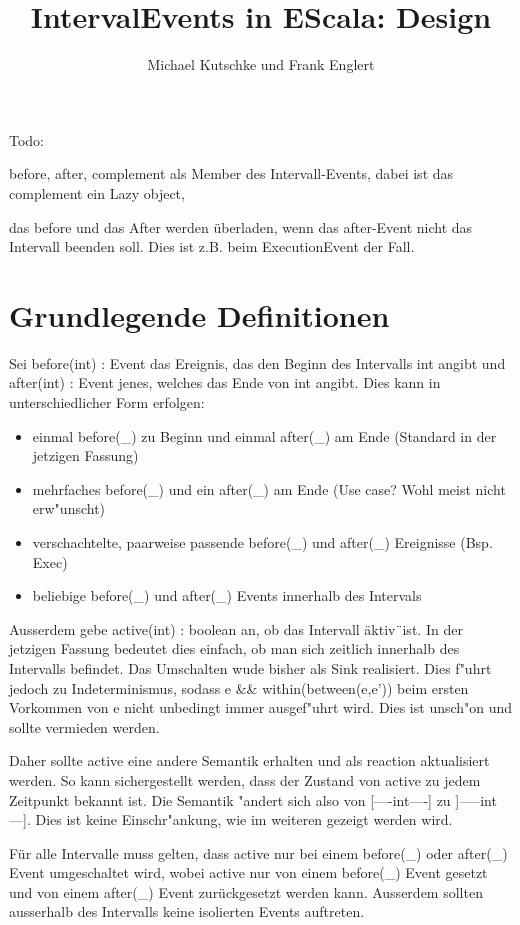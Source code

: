 \documentclass[article,colorback,accentcolor=tud4c]{tudreport}
\title{IntervalEvents in EScala: Design}
\subtitle{Michael Kutschke und Frank Englert}
\begin{document}
\maketitle

\tableofcontents


Todo:

before, after, complement als Member des Intervall-Events, dabei ist das complement ein Lazy object,

das before und das After werden überladen, wenn das after-Event nicht das Intervall beenden soll. Dies ist z.B. beim ExecutionEvent der Fall.

\section{Grundlegende Definitionen}
Sei before(int) : Event das Ereignis, das den Beginn des Intervalls int angibt und after(int) : Event jenes, welches das Ende von int angibt. Dies kann in unterschiedlicher Form erfolgen:
\begin{itemize}
\item einmal before(\_) zu Beginn und einmal after(\_) am Ende (Standard in der jetzigen Fassung)
\item mehrfaches before(\_) und ein after(\_) am Ende (Use case? Wohl meist nicht erw"unscht)
\item verschachtelte, paarweise passende before(\_) und after(\_) Ereignisse (Bsp. Exec)
\item beliebige before(\_) und after(\_) Events innerhalb des Intervals
\end{itemize}
Ausserdem gebe active(int) : boolean an, ob das Intervall \"aktiv\"\  ist. In der jetzigen Fassung bedeutet dies einfach, ob man sich zeitlich innerhalb des Intervalls befindet. Das Umschalten wude bisher als Sink realisiert. Dies f"uhrt jedoch zu Indeterminismus, sodass e \&\& within(between(e,e')) beim ersten Vorkommen von e nicht unbedingt immer ausgef"uhrt wird. Dies ist unsch"on und sollte vermieden werden.

Daher sollte active eine andere Semantik erhalten und als reaction aktualisiert werden. So kann sichergestellt werden, dass der Zustand von active zu jedem Zeitpunkt bekannt ist. Die Semantik "andert sich also von [----int----] zu ]-----int---]. Dies ist keine Einschr"ankung, wie im weiteren gezeigt werden wird.

Für alle Intervalle muss gelten, dass active nur bei einem before(\_) oder after(\_) Event umgeschaltet wird, wobei active nur von einem before(\_) Event gesetzt und von einem after(\_) Event zurückgesetzt werden kann. Ausserdem sollten ausserhalb des Intervalls keine isolierten Events auftreten.
\end{document}

